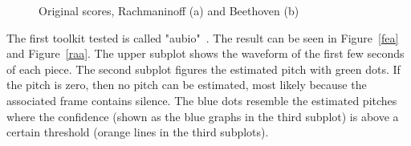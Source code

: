 \begin{figure}[htbp]
	\centering
	\caption{Original scores, Rachmaninoff (a) and Beethoven (b)}
	\label{fig:sheets}
\end{figure}
The first toolkit tested is called "aubio"~\cite{aubio1}. The result can be seen in Figure~\ref{fea} and Figure~\ref{raa}. The upper subplot shows the waveform of the first few seconds of each piece. The second subplot figures the estimated pitch with green dots. If the pitch is zero, then no pitch can be estimated, most likely because the associated frame contains silence. The blue dots resemble the estimated pitches where the confidence (shown as the blue graphs in the third subplot) is above a certain threshold (orange lines in the third subplots).
